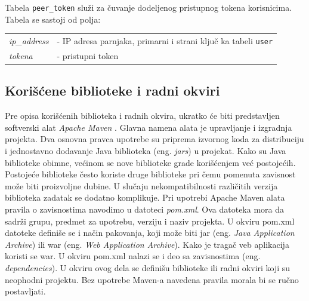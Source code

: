 \documentclass[12pt,oneside]{memoir}
\begin{document}
Tabela \texttt{peer\_token} služi za čuvanje dodeljenog pristupnog tokena korisnicima. Tabela se sastoji od polja: 

\begin{center}
\begin{tabular}{ p{3.7cm} p{10.3cm} }
 \textit{ip\_address} & - IP adresa parnjaka, primarni i strani ključ ka tabeli \texttt{user}\\ 
 \textit{tokena} & - pristupni token \\
\end{tabular}
\end{center}


\subsection{Korišćene biblioteke i radni okviri}
\label{implementacija.1.2}

Pre opisa korišćenih biblioteka i radnih okvira, ukratko će biti predstavljen softverski alat \textit{Apache Maven} \cite{Maven}. Glavna namena alata je upravljanje i izgradnja projekta. Dva osnovna pravca upotrebe su priprema izvornog koda za distribuciju i jednostavno dodavanje Java biblioteka (eng. \textit{jars}) u projekat. Kako su Java biblioteke obimne, većinom se nove biblioteke grade korišćenjem već postojećih. Postojeće biblioteke često koriste druge biblioteke pri čemu pomenuta zavisnost može biti proizvoljne dubine. U slučaju nekompatibilnosti različitih verzija biblioteka zadatak se dodatno komplikuje.
Pri upotrebi Apache Maven alata pravila o zavisnostima navodimo u datoteci \textit{pom.xml}. Ova datoteka mora da sadrži grupu, predmet za upotrebu, verziju i naziv projekta. U okviru pom.xml datoteke definiše se i način pakovanja, koji može biti jar (eng. \textit{Java Application Archive}) ili war (eng. \textit{Web Application Archive}). Kako je tragač veb aplikacija koristi se war. U okviru pom.xml nalazi se i deo sa zavisnostima (eng. \textit{dependencies}). U okviru ovog dela se definišu biblioteke ili radni okviri koji su neophodni projektu. Bez upotrebe Maven-a navedena pravila morala bi se ručno postavljati. 
\end{document}
